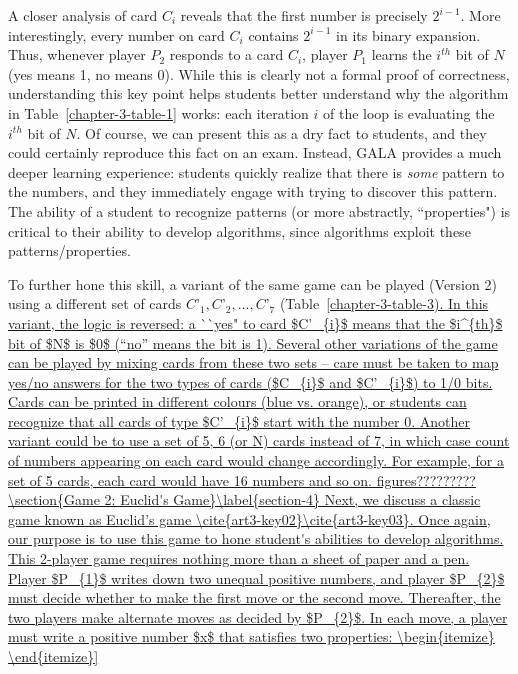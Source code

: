 \begin{multicols}{2}
A closer analysis of card $C_{i}$ reveals that the first number is precisely $2^{i-1}$. More interestingly, every number on card $C_{i}$ contains $2^{i-1}$ in its binary expansion. Thus, whenever player $P_{2}$ responds to a card $C_{i}$, player $P_{1}$ learns the $i^{th}$ bit of $N$ (yes means 1, no means 0). While this is clearly not a formal proof of correctness, understanding this key point helps students better understand why the algorithm in Table~\ref{chapter-3-table-1} works: each iteration $i$ of the loop is evaluating the $i^{th}$ bit of $N$. Of course, we can present this as a dry fact to students, and they could certainly reproduce this fact on an exam. Instead, GALA provides a much deeper learning experience: students quickly realize that there is \textit{some} pattern to the numbers, and they immediately engage with trying to discover this pattern. The ability of a student to recognize patterns (or more abstractly, ``properties") is critical to their ability to develop algorithms, since algorithms exploit these patterns/properties.
 
To further hone this skill, a variant of the same game can be played (Version 2) using a different set of cards $C’_{1}, C’_{2},..., C’_{7}$ (Table~\ref{chapter-3-table-3). In this variant, the logic is reversed: a ``yes" to card $C’_{i}$ means that the $i^{th}$ bit of $N$ is $0$ (“no” means the bit is 1). Several other variations of the game can be played by mixing cards from these two sets – care must be taken to map yes/no answers for the two types of cards ($C_{i}$ and $C’_{i}$) to 1/0 bits. Cards can be printed in different colours (blue vs. orange), or students can recognize that all cards of type $C’_{i}$ start with the number 0. Another variant could be to use a set of 5, 6 (or N) cards instead of 7, in which case count of numbers appearing on each card would change accordingly. For example, for a set of 5 cards, each card would have 16 numbers and so on. 
 
figures?????????

\section{Game 2: Euclid's Game}\label{section-4} 

Next, we discuss a classic game known as Euclid’s game \cite{art3-key02}\cite{art3-key03}. Once again, our purpose is to use this game to hone student's abilities to develop algorithms. This 2-player game requires nothing more than a sheet of paper and a pen. Player $P_{1}$ writes down two unequal positive numbers, and player $P_{2}$ must decide whether to make the first move or the second move. Thereafter, the two players make alternate moves as decided by $P_{2}$. In each move, a player must write a positive number $x$ that satisfies two properties:
\begin{itemize}


\end{itemize}}
\end{multicols}
